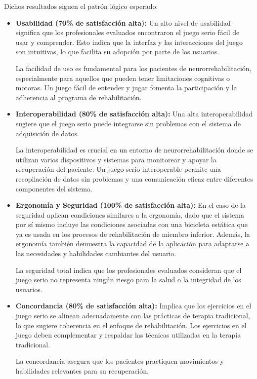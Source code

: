 Dichos resultados siguen el patrón lógico esperado:
\begin{itemize}
    \item \textbf{Usabilidad (70\% de satisfacción alta):} Un alto nivel de usabilidad significa que los profesionales evaluados encontraron el juego serio fácil de usar y comprender. Esto indica que la interfaz y las interacciones del juego son intuitivas, lo que facilita su adopción por parte de los usuarios.
    
    La facilidad de uso es fundamental para los pacientes de neurorrehabilitación, especialmente para aquellos que pueden tener limitaciones cognitivas o motoras. Un juego fácil de entender y jugar fomenta la participación y la adherencia al programa de rehabilitación.


    \item \textbf{Interoperabilidad (80\% de satisfacción alta):} Una alta interoperabilidad sugiere que el juego serio puede integrarse sin problemas con el sistema de adquisición de datos.
    
    La interoperabilidad es crucial en un entorno de neurorrehabilitación donde se utilizan varios dispositivos y sistemas para monitorear y apoyar la recuperación del paciente. Un juego serio interoperable permite una recopilación de datos sin problemas y una comunicación eficaz entre diferentes componentes del sistema.


    \item \textbf{Ergonomía y Seguridad (100\% de satisfacción alta):} En el caso de la seguridad aplican condiciones similares a la ergonomía, dado que el sistema por sí mismo incluye las condiciones asociadas con una bicicleta estática que ya es usada en los procesos de rehabilitación de miembro inferior. Además, la ergonomía también demuestra la capacidad de la aplicación para adaptarse a las necesidades y habilidades cambiantes del usuario. 
    
    La seguridad total indica que los profesionales evaluados consideran que el juego serio no representa ningún riesgo para la salud o la integridad de los usuarios.
    
    \item \textbf{Concordancia (80\% de satisfacción alta):} Implica que los ejercicios en el juego serio se alinean adecuadamente con las prácticas de terapia tradicional, lo que sugiere coherencia en el enfoque de rehabilitación. Los ejercicios en el juego deben complementar y respaldar las técnicas utilizadas en la terapia tradicional. 
    
    La concordancia asegura que los pacientes practiquen movimientos y habilidades relevantes para su recuperación.
\end{itemize}

